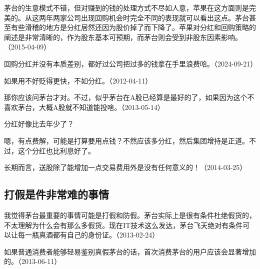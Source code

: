 
茅台的生意模式不错，但对赚到的钱的处理方式不尽如人意，苹果在这方面则是完美的。从这两年两家公司出现回购机会时完全不同的表现就可以看出这点。茅台甚至有些滑稽的地方是分红居然还因为股价掉了而下降了。苹果对分红和回购策略的阐述是非常清晰的，作为股东基本可预期，而茅台则会受到非股东因素影响。（2015-04-09）



回购分红并没有本质差别，都好过公司把过多的钱拿在手里浪费哈。（2024-09-21）


如果用不好贬得更快，不如分红。（2012-04-11）


那你应该问茅台才对。不过，似乎茅台在A股已经算是最好的了，如果因为这个不喜欢茅台，大概A股就不知道能投啥。（2013-05-14）


分红好像比去年少了？

嗯，有点费解，可能是打算要用点钱？不然应该多分红，然后集团增持是正道。不过，这个分红也比利息好了。


长期而言，送股除了能增加一点交易费用外是没有任何意义的！（2014-03-25）

\subsection{打假是件非常难的事情}

我觉得茅台最重要的事情可能是打假和防假。茅台实际上是很有条件杜绝假货的，不太理解为什么会有那么多假货。现在IT技术这么发达，茅台飞天绝对有条件可以让每一瓶真酒都有自己的身份证。（2013-02-24）


如果普通消费者能够轻易鉴别真假茅台的话，首次消费茅台的用户应该会显著增加的。（2013-06-11）

